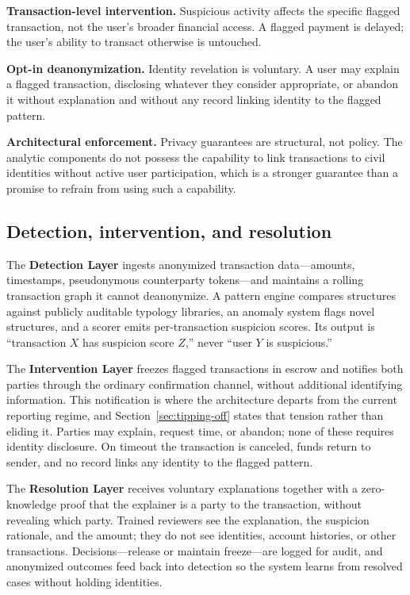 \documentclass[11pt]{article}
\begin{document}
\textbf{Transaction-level intervention.} Suspicious activity affects the specific flagged
transaction, not the user's broader financial access. A flagged payment is delayed; the user's
ability to transact otherwise is untouched.

\textbf{Opt-in deanonymization.} Identity revelation is voluntary. A user may explain a flagged
transaction, disclosing whatever they consider appropriate, or abandon it without explanation and
without any record linking identity to the flagged pattern.

\textbf{Architectural enforcement.} Privacy guarantees are structural, not policy. The analytic
components do not possess the capability to link transactions to civil identities without active user
participation, which is a stronger guarantee than a promise to refrain from using such a capability.

\subsection{Detection, intervention, and resolution}

The \textbf{Detection Layer} ingests anonymized transaction data---amounts, timestamps, pseudonymous
counterparty tokens---and maintains a rolling transaction graph it cannot deanonymize. A pattern
engine compares structures against publicly auditable typology libraries, an anomaly system flags
novel structures, and a scorer emits per-transaction suspicion scores. Its output is ``transaction
$X$ has suspicion score $Z$,'' never ``user $Y$ is suspicious.''

The \textbf{Intervention Layer} freezes flagged transactions in escrow and notifies both parties
through the ordinary confirmation channel, without additional identifying information. This
notification is where the architecture departs from the current reporting regime, and
Section~\ref{sec:tipping-off} states that tension rather than eliding it. Parties may explain, request
time, or abandon; none of these requires identity disclosure. On timeout the transaction is canceled,
funds return to sender, and no record links any identity to the flagged pattern.

The \textbf{Resolution Layer} receives voluntary explanations together with a zero-knowledge proof
that the explainer is a party to the transaction, without revealing which party. Trained reviewers see
the explanation, the suspicion rationale, and the amount; they do not see identities, account
histories, or other transactions. Decisions---release or maintain freeze---are logged for audit, and
anonymized outcomes feed back into detection so the system learns from resolved cases without holding
identities.
\end{document}

